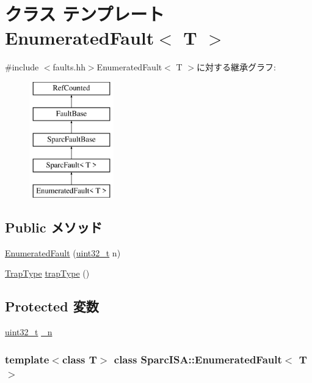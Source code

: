\hypertarget{classSparcISA_1_1EnumeratedFault}{
\section{クラス テンプレート EnumeratedFault$<$ T $>$}
\label{classSparcISA_1_1EnumeratedFault}
}


{\ttfamily \#include $<$faults.hh$>$}EnumeratedFault$<$ T $>$に対する継承グラフ:\begin{figure}[H]
\begin{center}
\leavevmode
\includegraphics[height=5cm]{classSparcISA_1_1EnumeratedFault}
\end{center}
\end{figure}
\subsection*{Public メソッド}
\begin{DoxyCompactItemize}
\item 
\hyperlink{classSparcISA_1_1EnumeratedFault_ae5fa39ce2664a5f64c5923c83bf40b5a}{EnumeratedFault} (\hyperlink{Type_8hh_a435d1572bf3f880d55459d9805097f62}{uint32\_\-t} n)
\item 
\hyperlink{namespaceSparcISA_aabeb6cc11127ef5b6ebc776bfc5fb95b}{TrapType} \hyperlink{classSparcISA_1_1EnumeratedFault_aa059963bc65ed73d2d744374cd6da5b1}{trapType} ()
\end{DoxyCompactItemize}
\subsection*{Protected 変数}
\begin{DoxyCompactItemize}
\item 
\hyperlink{Type_8hh_a435d1572bf3f880d55459d9805097f62}{uint32\_\-t} \hyperlink{classSparcISA_1_1EnumeratedFault_a7c88a7c207b78997dab513d682ef9d76}{\_\-n}
\end{DoxyCompactItemize}
\subsubsection*{template$<$class T$>$ class SparcISA::EnumeratedFault$<$ T $>$}



